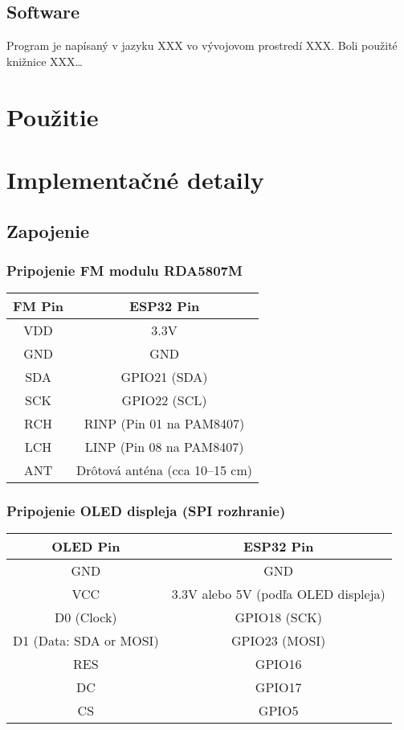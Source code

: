 \documentclass[11pt, a4paper]{article}
\begin{document}
\subsection{Software}
Program je napísaný v jazyku XXX vo vývojovom prostredí XXX. Boli použité knižnice XXX\dots

\section{Použitie}

\section{Implementačné detaily}
\subsection{Zapojenie}
\subsubsection{Pripojenie FM modulu RDA5807M}

\begin{tabular}{|c|c|}
\hline
\textbf{FM Pin} & \textbf{ESP32 Pin} \\
\hline
VDD & 3.3V \\
GND & GND \\
SDA & GPIO21 (SDA) \\
SCK & GPIO22 (SCL) \\
RCH & RINP (Pin 01 na PAM8407) \\
LCH & LINP (Pin 08 na PAM8407) \\
ANT & Drôtová anténa (cca 10–15 cm) \\
\hline
\end{tabular}

\subsubsection{Pripojenie OLED displeja (SPI rozhranie)}

\begin{tabular}{|c|c|}
\hline
\textbf{OLED Pin} & \textbf{ESP32 Pin} \\
\hline
GND & GND \\
VCC & 3.3V alebo 5V (podľa OLED displeja) \\
D0 (Clock) & GPIO18 (SCK) \\
D1 (Data: SDA or MOSI)& GPIO23 (MOSI) \\
RES & GPIO16 \\
DC & GPIO17 \\
CS & GPIO5 \\
\hline
\end{tabular}
\\
\end{document}
